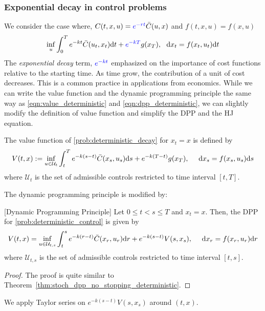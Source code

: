 \documentclass[11pt]{book}
\newcommand{\dt}{\text{\normalfont d}t}
\newcommand{\ds}{\text{\normalfont d}s}
\newcommand{\dr}{\text{\normalfont d}r}
\newcommand{\dx}{\text{\normalfont d}x}
\begin{document}
\subsubsection{Exponential decay in control problems}
We consider the case where, $C(t,x,u)={\color{blue}e^{-r t}}\bar{C}(u,x)$ and $f(t,x,u)=f(x,u)$
\begin{equation}
\label{prob:deterministic_decay}
    \inf_{u}\int_0^T e^{-k t}\bar{C}(u_t,x_t)\dt + {\color{blue}e^{-k T}}g(x_T),~~\dx_t=f(x_t,u_t)\dt
\end{equation}
The \emph{exponential decay} term, ${\color{blue}e^{-kt}}$ emphasized on the importance of cost functions relative to the starting time. As time grow, the contribution of a unit of cost decreases. This is a common practice in applications from economics. While we can write the value function and the dynamic programming principle the same way as \eqref{eqn:value_deterministic} and \eqref{eqn:dpp_deterministic}, we can slightly modify the definition of value function and simplify the DPP and the HJ equation.
\begin{defn}
The value function of \eqref{prob:deterministic_decay} for $x_t=x$ is defined by
\begin{equation}\label{eqn:value_deterministic_decay}
    V(t,x):= \inf_{u\in\mathcal{U}_{t}}\int_t^Te^{-k(s-t)}\bar{C}(x_s,u_s){{\ds}}+e^{-k(T-t)}g(x_T),~~~~{\dx}_s=f(x_s,u_s){{\ds}}
\end{equation}
where $\mathcal{U}_{t}$ is the set of admissible controls restricted to time interval $[t,T]$.
\end{defn}
The dynamic programming principle is modified by:
\begin{thm}\label{thm:stoch_dpp_no_stopping_deterministic_decay}
    [Dynamic Programming Principle]
    Let $0\le t<s\le T$ and $x_t=x$. Then, the DPP for \eqref{prob:deterministic_control} is given by 
    \begin{equation} \label{eqn:dpp_deterministic_decay}
    V(t,x) =\inf_{u\in\mathcal{U}_{t,s}}\int_t^s e^{-k(r-t)}\bar{C}(x_r,u_r){{\dr}}+e^{-k(s-t)}V(s,x_s),~~~~{\dx}_r=f(x_r,u_r){{\dr}}
\end{equation}
where $\mathcal{U}_{t,s}$ is the set of admissible controls restricted to time interval $[t,s]$.
\end{thm}
\begin{proof}
    The proof is quite similar to Theorem~\ref{thm:stoch_dpp_no_stopping_deterministic}.
\end{proof}
    We apply Taylor series on $e^{-k(s-t)}V(s,x_s)$ around $(t,x)$.
\end{document}
